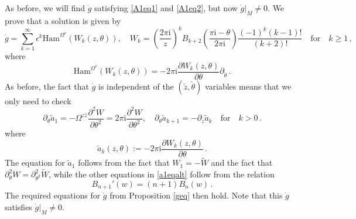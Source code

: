 \documentclass{article}
\theoremstyle{definition}
\numberwithin{equation}{section}
\begin{document}
As before, we will find $\dot{g}$ satisfying \eqref{A1eq1} and \eqref{A1eq2}, but now $\dot{g}|_M\neq 0$.  We  prove that a solution is given by 
\begin{equation}\label{a1altsol}
\dot{g}=\sum_{k=1}^{\infty}\epsilon^k\text{Ham}^{\Omega^{v}}(W_k(z,\theta)), \quad W_k=\left(\frac{2\pi \mathrm{i}}{z}\right)^kB_{k+2}\left(\frac{\pi \mathrm{i}-\theta}{2\pi \mathrm{i}}\right)\frac{(-1)^{k}(k-1)!}{(k+2)!} \quad \text{for} \quad k\geq 1\,,
\end{equation}
where 
\begin{equation}\label{a1althams}
    \text{Ham}^{\Omega^{v}}(W_k(z,\theta))=-2\pi \mathrm{i}\frac{\partial W_k(z,\theta)}{\partial \theta}\partial_{\check{\theta}}\,.
\end{equation}  
As before, the fact that $\dot{g}$ is independent of the $(\check{z},\check{\theta})$ variables means that we only need to check
\begin{equation}\label{a1eqalt}
    \partial_{\theta}\tilde{a}_1=-\Omega^{z\hat{z}}\frac{\partial^2 W}{\partial \theta^2}=2\pi \mathrm{i}\frac{\partial^2 W}{\partial \theta^2}, \quad \partial_{\theta}\tilde{a}_{k+1}=-\partial_{z}\tilde{a}_k \quad \text{for} \quad k>0\,.
\end{equation}
where 
\begin{equation*}
    \tilde{a}_k(z,\theta):=-2\pi \mathrm{i}\frac{\partial W_k(z,\theta)}{\partial \theta}\,.
\end{equation*}
The equation for $\tilde{a}_1$ follows from the fact that $W_1=-\widetilde{W}$ and the fact that $\partial^2_\theta W= \partial^2_{\theta^2}\widetilde{W}$, while the other equations in \eqref{a1eqalt} follow from the relation 
\begin{equation}\label{berrel}
    B_{n+1}'(w)=(n+1)B_{n}(w)\,.
\end{equation}
The required equations for $\dot{g}$ from Proposition \ref{geq} then hold. Note that this $\dot{g}$ satisfies $\dot{g}|_M\neq 0$.\\
\end{document}
